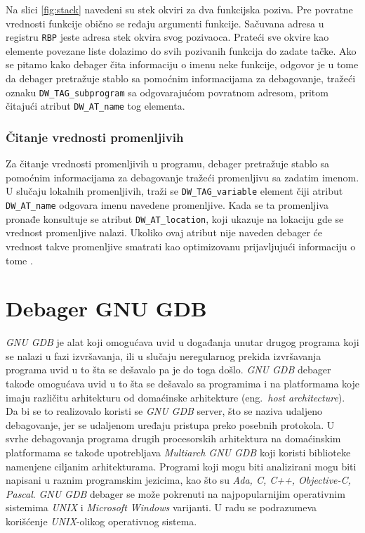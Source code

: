 \documentclass[12pt,oneside]{memoir}
\begin{document}
Na slici \ref{fig:stack} navedeni su stek okviri za dva funkcijska poziva. Pre povratne vrednosti funkcije obično se ređaju argumenti funkcije. Sačuvana adresa u registru \texttt{RBP} jeste adresa stek okvira svog pozivaoca. Prateći sve okvire kao elemente povezane liste dolazimo do svih pozivanih funkcija do zadate tačke. Ako se pitamo kako debager čita informaciju o imenu neke funkcije, odgovor je u tome da debager pretražuje stablo sa pomoćnim informacijama za debagovanje, tražeći oznaku \texttt{DW\_TAG\_subprogram} sa odgovarajućom povratnom adresom, pritom čitajući atribut \texttt{DW\_AT\_name} tog elementa.

\subsection{Čitanje vrednosti promenljivih}

Za čitanje vrednosti promenljivih u programu, debager pretražuje stablo sa pomoćnim informacijama za debagovanje tražeći promenljivu sa zadatim imenom. U slučaju lokalnih promenljivih, traži se \texttt{DW\_TAG\_variable} element čiji atribut \texttt{DW\_AT\_name} odgovara imenu navedene promenljive. Kada se ta promenljiva pronađe konsultuje se atribut \texttt{DW\_AT\_location}, koji ukazuje na lokaciju gde se vrednost promenljive nalazi. Ukoliko ovaj atribut nije naveden debager će vrednost takve promenljive smatrati kao optimizovanu prijavljujući informaciju o tome \cite{GDB}.

\chapter{Debager GNU GDB}
\label{chp:GDB}

\emph{GNU GDB} je alat koji omogućava uvid u događanja unutar drugog programa koji se nalazi u fazi izvršavanja, ili u slučaju neregularnog prekida izvršavanja programa uvid u to šta se dešavalo pa je do toga došlo. \emph{GNU GDB} debager takođe omogućava uvid u to šta se dešavalo sa programima i na platformama koje imaju različitu arhitekturu od domaćinske arhitekture (eng.~\emph{host architecture}). Da bi se to realizovalo koristi se \emph{GNU GDB} server, što se naziva udaljeno debagovanje, jer se udaljenom uređaju pristupa preko posebnih protokola. U svrhe debagovanja programa drugih procesorskih arhitektura na domaćinskim platformama se takođe upotrebljava \emph{Multiarch GNU GDB} koji koristi biblioteke namenjene ciljanim arhitekturama. Programi koji mogu biti analizirani mogu biti napisani u raznim programskim jezicima, kao što su \emph{Ada, C, C++, Objective-C, Pascal}. \emph{GNU GDB} debager se može pokrenuti na najpopularnijim operativnim sistemima \emph{UNIX} i \emph{Microsoft Windows} varijanti. U radu se podrazumeva korišćenje \emph{UNIX}-olikog operativnog sistema.
\end{document}

